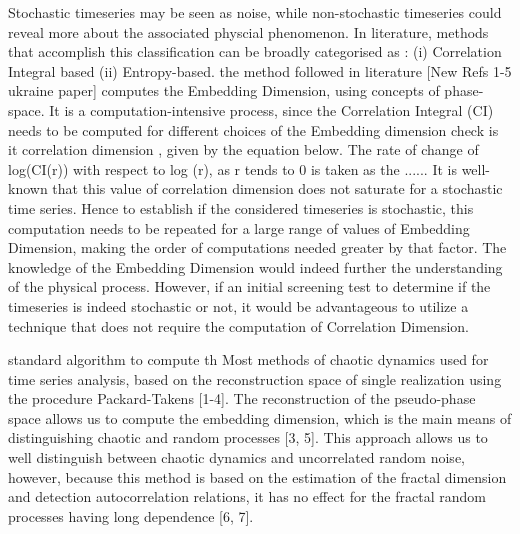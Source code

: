 \documentclass[journal]{IEEEtran}
\begin{document}
Stochastic timeseries may be seen as noise, while non-stochastic timeseries could reveal more about the associated physcial phenomenon.
 In literature, methods that accomplish this classification can be broadly categorised as : (i) Correlation Integral based (ii) Entropy-based.   the method followed in literature [New Refs 1-5 ukraine paper] computes the Embedding Dimension, using concepts of phase-space.
It is a computation-intensive process, since the Correlation Integral (CI) needs to be computed for different choices of the Embedding dimension check is it correlation dimension , given by the equation below. The rate of change of log(CI(r)) with respect to log (r), as r tends to 0 is taken as the ...... It is well-known that this value of correlation dimension does not saturate for a stochastic time series. Hence to establish if the considered timeseries is stochastic, this computation needs to be repeated for a large range of values of Embedding Dimension, making the order of computations needed greater by that factor. The knowledge of the Embedding Dimension would indeed further the understanding of the physical process. However, if an initial screening test to determine if the timeseries is indeed stochastic or not, it would be advantageous to utilize a technique that does not require the computation of Correlation Dimension.

standard algorithm to compute th
Most methods of chaotic dynamics used for time series analysis, based on the reconstruction
space of single realization using the procedure Packard-Takens [1-4]. The reconstruction of the
pseudo-phase space allows us to compute the embedding dimension, which is the main means of
distinguishing chaotic and random processes [3, 5]. This approach allows us to well distinguish
between chaotic dynamics and uncorrelated random noise, however, because this method is based
on the estimation of the fractal dimension and detection autocorrelation relations, it has no effect for
the fractal random processes having long dependence [6, 7].
\end{document}
